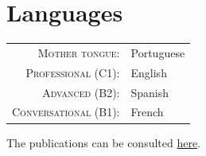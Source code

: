 \documentclass[a4paper,11pt]{article}
\begin{document}

    \vspace{18pt}

    \section{Languages}

      \begin{tabular}{rp{10cm}}

        \textsc{Mother tongue:} & Portuguese \\

        \textsc{Professional (C1):} & English \\

        \textsc{Advanced (B2):} & Spanish \\

        \textsc{Conversational (B1):} & French \\

      \end{tabular}


  \newpage

  The publications can be consulted \href{https://joaquimcampos.com/pubs.html}{here}. \\[5pt]

  \begin{bibunit}
    \renewcommand\refname{Publications: Science}

    \nocite{
      goujonStableParameterizationContinuous2023,
      aziznejadMeasuringComplexityLearning2023,
      camposLearningContinuousPiecewiseLinear2022,
      bohraLearningActivationFunctions2020,
      aziznejadDeepNeuralNetworks2020,
      djelouahNeuralInterFrameCompression2019,
      camposContentAdaptiveOptimization2019}

  \end{bibunit}

  \vspace{20pt}

  \begin{bibunit}
    \renewcommand\refname{Publications: Philosophy}

    \nocite{
      camposMahayanaBuddhistEthicsWork-in-Progress,
      camposWrongnessKillingNonHuman2018} %

  \end{bibunit}
\end{document}
